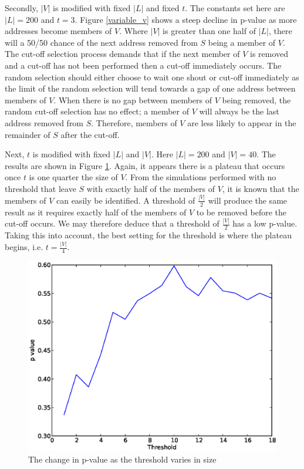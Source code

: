 \documentclass[ %
                    author={Luke Murray},
                supervisor={Dr. Simon Hollis},
                     title={Shadow Peer-to-Peer Networks},
                  subtitle={},
                    degree={MEng},
                      year={2013} ]{thesis}
\begin{document}
Secondly, $|V|$ is modified with fixed $|L|$ and fixed $t$. The constants set here are $|L| = 200$ and $t = 3$. Figure \ref{variable_v} shows a steep decline in p-value as more addresses become members of $V$. Where $|V|$ is greater than one half of $|L|$, there will a 50/50 chance of the next address removed from $S$ being a member of $V$. The cut-off selection process demands that if the next member of $V$ is removed and a cut-off has not been performed then a cut-off immediately occurs. The random selection should either choose to wait one shout or cut-off immediately as the limit of the random selection will tend towards a gap of one address between members of $V$. When there is no gap between members of $V$ being removed, the random cut-off selection has no effect; a member of $V$ will always be the last address removed from $S$. Therefore, members of $V$ are less likely to appear in the remainder of $S$ after the cut-off.

Next, $t$ is modified with fixed $|L|$ and $|V|$. Here $|L| = 200$ and $|V| = 40$. The results are shown in Figure \ref{variable_t}. Again, it appears there is a plateau that occurs once $t$ is one quarter the size of $V$. From the simulations performed with no threshold that leave $S$ with exactly half of the members of $V$, it is known that the members of $V$ can easily be identified. A threshold of $\frac{|V|}{2}$ will produce the same result as it requires exactly half of the members of $V$ to be removed before the cut-off occurs. We may therefore deduce that a threshold of $\frac{|V|}{2}$ has a low p-value. Taking this into account, the best setting for the threshold is where the plateau begins, i.e. $t = \frac{|V|}{4}$.

\begin{figure}[h]
    \centering
    \begin{minipage}[b]{0.4\linewidth}
        \centering
        \includegraphics[width=\linewidth]{diagrams/variable_t2.eps}
        \caption{The change in p-value as the threshold varies in size}
        \label{variable_t}
    \end{minipage}
\end{figure}
\end{document}
